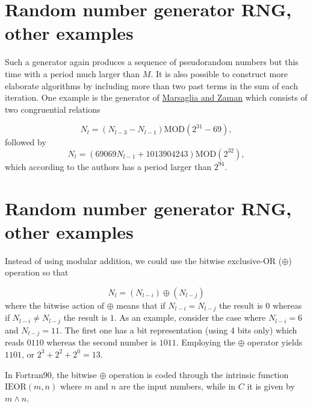 \documentclass[%
oneside,                 %
final,                   %
10pt]{article}
\newenvironment{block_mdfboxadmon}[1][]{
\begin{block_mdfboxmdframed}[frametitle=#1]
}
{
\end{block_mdfboxmdframed}
}
\begin{document}
\section{Random number generator RNG, other examples}

\begin{block_mdfboxadmon}[]
Such a generator again produces a sequence of pseudorandom numbers
but this time with a period much larger than $M$.
It is also possible to construct more elaborate algorithms by including
more than two past terms in the sum of each iteration.
One example is the generator of \href{{http://dl.acm.org/citation.cfm?id=187154}}{Marsaglia and Zaman}
which consists of two congruential relations

\begin{equation}
   N_l=(N_{l-3}-N_{l-1})\mathrm{MOD}(2^{31}-69),
   \label{eq:mz1}
\end{equation}
followed by
\begin{equation}
   N_l=(69069N_{l-1}+1013904243)\mathrm{MOD}(2^{32}),
   \label{eq:mz2}
\end{equation}
which according to the authors has a period larger than $2^{94}$.
\end{block_mdfboxadmon} %



\section{Random number generator RNG, other examples}

\begin{block_mdfboxadmon}[]
Instead of  using modular addition, we could use the bitwise
exclusive-OR ($\oplus$) operation so that

\begin{equation*}
   N_l=(N_{l-i})\oplus (N_{l-j})
\end{equation*}
where the bitwise action of $\oplus$ means that if $N_{l-i}=N_{l-j}$ the result is
$0$ whereas if $N_{l-i}\ne N_{l-j}$ the result is
$1$. As an example, consider the case where  $N_{l-i}=6$ and $N_{l-j}=11$. The first
one has a bit representation (using 4 bits only) which reads $0110$ whereas the 
second number is $1011$. Employing the $\oplus$ operator yields 
$1101$, or $2^3+2^2+2^0=13$.

In Fortran90, the bitwise $\oplus$ operation is coded through the intrinsic
function $\mathrm{IEOR}(m,n)$ where $m$ and $n$ are the input numbers, while in $C$
it is given by $m\wedge n$.
\end{block_mdfboxadmon} %
\end{document}
